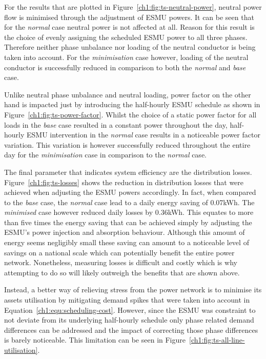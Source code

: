 

For the results that are plotted in Figure~\ref{ch1:fig:ts-neutral-power}, neutral power flow is minimised through the adjustment of ESMU powers.
It can be seen that for the \textit{normal} case neutral power is not affected at all.
Reason for this result is the choice of evenly assigning the scheduled ESMU power to all three phases.
Therefore neither phase unbalance nor loading of the neutral conductor is being taken into account.
For the \textit{minimisation} case however, loading of the neutral conductor is successfully reduced in comparison to both the \textit{normal} and \textit{base} case.



Unlike neutral phase unbalance and neutral loading, power factor on the other hand is impacted just by introducing the half-hourly ESMU schedule as shown in Figure~\ref{ch1:fig:ts-power-factor}.
Whilst the choice of a static power factor for all loads in the \textit{base} case resulted in a constant power throughout the day, half-hourly ESMU intervention in the \textit{normal} case results in a noticeable power factor variation.
This variation is however successfully reduced throughout the entire day for the \textit{minimisation} case in comparison to the \textit{normal} case.



The final parameter that indicates system efficiency are the distribution losses.
Figure~\ref{ch1:fig:ts-losses} shows the reduction in distribution losses that were achieved when adjusting the ESMU powers accordingly.
In fact, when compared to the \textit{base} case, the \textit{normal} case lead to a daily energy saving of 0.07kWh.
The \textit{minimised} case however reduced daily losses by 0.36kWh.
This equates to more than five times the energy saving that can be achieved simply by adjusting the ESMU's power injection and absorption behaviour.
Although this amount of energy seems negligibly small these saving can amount to a noticeable level of savings on a national scale which can potentially benefit the entire power network.
Nonetheless, measuring losses is difficult and costly which is why attempting to do so will likely outweigh the benefits that are shown above.

Instead, a better way of relieving stress from the power network is to minimise its assets utilisation by mitigating demand spikes that were taken into account in Equation~\ref{ch1:equ:scheduling-cost}.
However, since the ESMU was constraint to not deviate from its underlying half-hourly schedule only phase related demand differences can be addressed and the impact of correcting those phase differences is barely noticeable.
This limitation can be seen in Figure~\ref{ch1:fig:ts-all-line-utilisation}.

